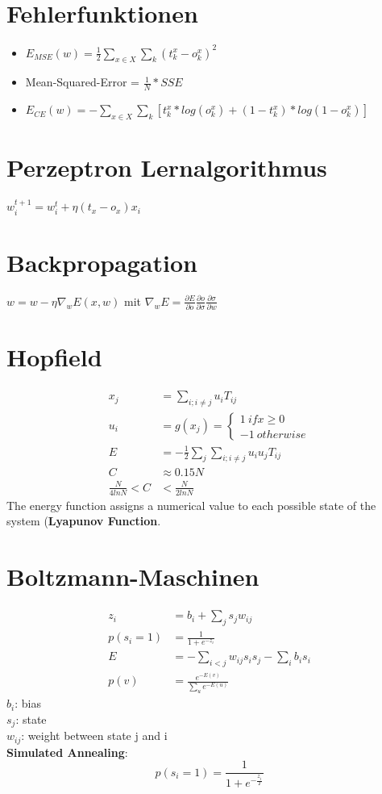 \documentclass[paper=a4, fontsize=11pt]{scrartcl} %
\begin{document}
\section{Fehlerfunktionen}

\begin{itemize}
\item $E_{MSE}(w) = \frac{1}{2} \sum\limits_{x \in X} \sum\limits_k (t^x_k - o^x_k)^2$
\item Mean-Squared-Error = $\frac{1}{N} * SSE$
\item $E_{CE}(w) = - \sum\limits_{x \in X} \sum\limits_k [t^x_k * log(o^x_k) + (1-t^x_k)*log(1-o^x_k)]$
\end{itemize}

\section{Perzeptron Lernalgorithmus}

$w_{i}^{t+1} = w_i^t + \eta (t_x - o_x) x_i$

\section{Backpropagation}

$w = w - \eta \nabla_w E(x,w)$ mit $\nabla_w E = \frac{\partial E}{\partial o} \frac{\partial o}{\partial \sigma} \frac{\partial \sigma}{\partial w}$

\section{Hopfield}
\begin{align*}
x_j &= \sum_{i; i \neq j} u_i T_{ij} \\
u_i &= g(x_j) = \begin{cases}
1 \: if x \geq 0\\
-1 \: otherwise
\end{cases} \\
E &= - \frac{1}{2} \sum_j \sum_{i;i \neq j} u_i u_j T_{ij} \\
C & \approx 0.15N \\
\frac{N}{4 ln N} < C & < \frac{N}{2 ln N}
\end{align*}
The energy function assigns a numerical value to each possible state of the system (\textbf{Lyapunov Function}.

\section{Boltzmann-Maschinen}
\begin{align*}
z_i &= b_i + \sum_j s_j w_{ij}\\
p(s_i = 1) &= \frac{1}{1 + e^{-z_i}} \\
E &= - \sum_{i < j} w_{ij} s_i s_j - \sum_i b_i s_i \\
p(v) &= \frac{e^{-E(v)}}{\sum_u e^{-E(u)}}
\end{align*}
$b_i$: bias\\
$s_j$: state\\
$w_{ij}$: weight between state j and i\\
\textbf{Simulated Annealing}:
\[
p(s_i = 1) = \frac{1}{1 + e^{-\frac{z_i}{T}}}
\]
\end{document}
